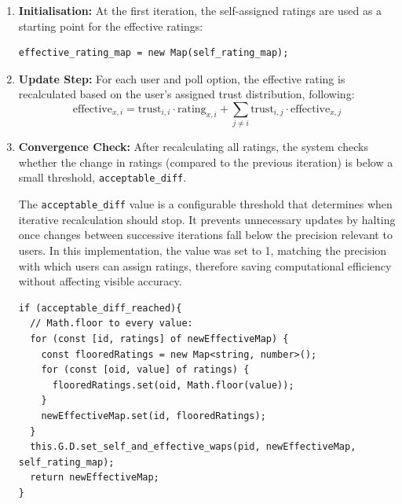\begin{enumerate}
    \item \textbf{Initialisation:} At the first iteration, the self-assigned ratings are used as a starting point for the effective ratings:
    \begin{verbatim}
effective_rating_map = new Map(self_rating_map);
    \end{verbatim}
    \item \textbf{Update Step:} For each user and poll option, the effective rating is recalculated based on the user's assigned trust distribution, following:
    \begin{equation}
      \text{effective}_{x, i} = \text{trust}_{i,i} \cdot \text{rating}_{x,i} + \sum_{j \neq i} \text{trust}_{i,j} \cdot \text{effective}_{x,j}
      \label{eq:effective_rating}
    \end{equation}      
    \item \textbf{Convergence Check:} After recalculating all ratings, the system checks whether the change in ratings (compared to the previous iteration) is below a small threshold, \texttt{acceptable\_diff}.

The \texttt{acceptable\_diff} value is a configurable threshold that determines when iterative recalculation should stop. It prevents unnecessary updates by halting once changes between successive iterations fall below the precision relevant to users. In this implementation, the value was set to 1, matching the precision with which users can assign ratings, therefore saving computational efficiency without affecting visible accuracy.

\begin{verbatim}
if (acceptable_diff_reached){
  // Math.floor to every value:
  for (const [id, ratings] of newEffectiveMap) {
    const flooredRatings = new Map<string, number>();
    for (const [oid, value] of ratings) {
      flooredRatings.set(oid, Math.floor(value));
    }
    newEffectiveMap.set(id, flooredRatings);
  }
  this.G.D.set_self_and_effective_waps(pid, newEffectiveMap, self_rating_map);
  return newEffectiveMap;
}
\end{verbatim}
\end{enumerate}

